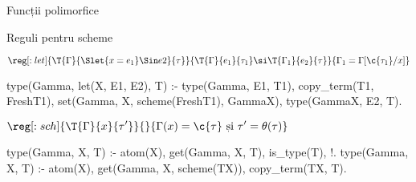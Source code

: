\documentclass[xcolor=x11names,compress,10pt]{beamer}
\begin{document}
\begin{section}{Funcții polimorfice}
    \begin{frame}[fragile]{Reguli pentru scheme}
      
      \begin{block}{$\displaystyle \reg[:let]{\T{\Gamma}{\Slet {x = e_1} \Sin e2}{\tau}}{\T{\Gamma}{e_1}{\tau_1} \si \T{\Gamma_1}{e_2}{\tau}}{\Gamma_1 = \Gamma[\c{\tau_1} / x]}$}
\pause
        \begin{asciipl}
type(Gamma, let(X, E1, E2), T) :-
    type(Gamma, E1, T1),
    copy_term(T1, FreshT1),   %
    set(Gamma, X, scheme(FreshT1), GammaX),
    type(GammaX, E2, T).
        \end{asciipl}
      \end{block}

\pause
      \begin{block}{$\displaystyle \reg[:sch]{\T{\Gamma}{x}{\tau'}}{}{\Gamma(x) = \c{\tau} \mbox{ și } \tau' = \theta(\tau)}$}
        \begin{asciipl}
type(Gamma, X, T) :-
    atom(X), get(Gamma, X, T), is_type(T), !.         
type(Gamma, X, T) :-
    atom(X), get(Gamma, X, scheme(TX)),
    copy_term(TX, T).         %
        \end{asciipl}
      \end{block}
    \end{frame}



  \end{section}

    
 
\begin{frame}
\begin{center}
\end{center}
\end{frame}

\end{document}
